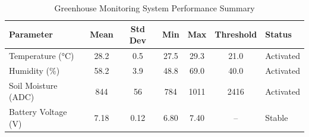 
\begin{table}[h]
\centering
\caption{Greenhouse Monitoring System Performance Summary}
\label{tab:performance}
\begin{tabular}{lcccccl}
\hline
\textbf{Parameter} & \textbf{Mean} & \textbf{Std Dev} & \textbf{Min} & \textbf{Max} & \textbf{Threshold} & \textbf{Status} \\
\hline
Temperature (°C) & 28.2 & 0.5 & 27.5 & 29.3 & 21.0 & Activated \\
Humidity (\%) & 58.2 & 3.9 & 48.8 & 69.0 & 40.0 & Activated \\
Soil Moisture (ADC) & 844 & 56 & 784 & 1011 & 2416 & Activated \\
Battery Voltage (V) & 7.18 & 0.12 & 6.80 & 7.40 & -- & Stable \\
\hline
\end{tabular}
\end{table}
